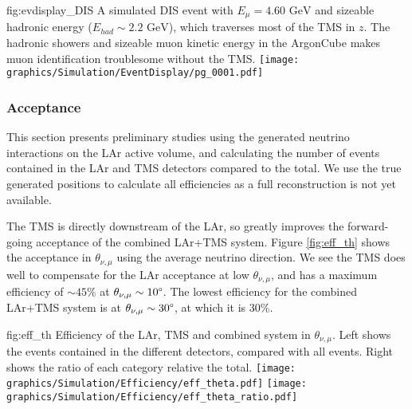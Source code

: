 \begin{dunefigure}[]{fig:evdisplay_DIS}
{A simulated DIS event with $E_\mu=4.60\text{ GeV}$ and sizeable hadronic energy ($E_{had}\sim2.2\text{ GeV}$), which traverses most of the TMS in $z$. The hadronic showers and sizeable muon kinetic energy in the ArgonCube makes muon identification troublesome without the TMS.}
\texttt{[image: graphics/Simulation/EventDisplay/pg\_0001.pdf]}
\end{dunefigure}

\clearpage

\subsubsection{Acceptance}
This section presents preliminary studies using the generated neutrino interactions on the LAr active volume, and calculating the number of events contained in the LAr and TMS detectors compared to the total. We use the true generated positions to calculate all efficiencies as a full reconstruction is not yet available.

The TMS is directly downstream of the LAr, so greatly improves the forward-going acceptance of the combined LAr+TMS system. Figure \ref{fig:eff_th} shows the acceptance in $\theta_{\nu,\mu}$ using the average neutrino direction. We see the TMS does well to compensate for the LAr acceptance at low $\theta_{\nu,\mu}$, and has a maximum efficiency of $\sim45\%$ at $\theta_{\nu,\mu}\sim10\degree$. The lowest efficiency for the combined LAr+TMS system is at $\theta_{\nu,\mu}\sim 30\degree$, at which it is 30\%.
\begin{dunefigure}[]{fig:eff_th}
{Efficiency of the LAr, TMS and combined system in $\theta_{\nu,\mu}$. Left shows the events contained in the different detectors, compared with all events. Right shows the ratio of each category relative the total.}
\texttt{[image: graphics/Simulation/Efficiency/eff\_theta.pdf]} \texttt{[image: graphics/Simulation/Efficiency/eff\_theta\_ratio.pdf]}
\end{dunefigure}

